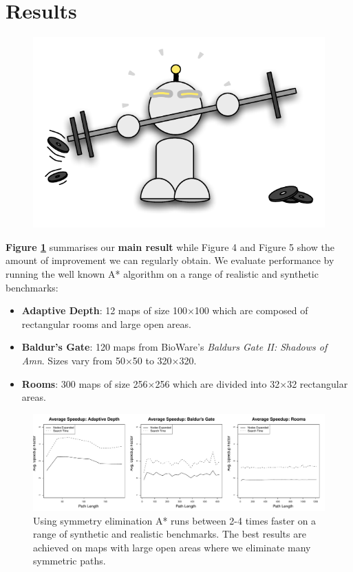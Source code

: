 \section{Results}

 \begin{figure}
    	\includegraphics[width=0.25\columnwidth, trim=0mm 10mm 0mm 0mm]{diagrams/robot_weights.pdf}
 \end{figure}
\textbf{Figure \ref{fig:speedup}} summarises our \textbf{main result} while Figure
4 and Figure 5 show the amount of improvement we
can regularly obtain. We evaluate performance by running the well known A* algorithm on a range of realistic and synthetic benchmarks:
\begin{itemize}
\item{
\textbf{Adaptive Depth}: 12 maps of size 100$\times$100 which are composed of
rectangular rooms and large open areas.
}
\item{
\textbf{Baldur's Gate}: 120 maps from BioWare's \emph{Baldurs Gate II: Shadows
of Amn}. Sizes vary from 50$\times$50 to 320$\times$320.
}
\item{
\textbf{Rooms}: 300 maps of size 256$\times$256 which are divided into 32$\times$32
rectangular areas. 
}
\end{itemize}


\begin{figure}[h]
\vspace{1em}
\label{fig:speedup}
\begin{center}
\includegraphics[width=\columnwidth]{diagrams/speedup}
\caption{Using symmetry elimination A* runs between 2-4 times faster on a range of synthetic
and realistic benchmarks.
The best results are achieved on maps with large open areas where we eliminate
many symmetric paths.}
\end{center}
\end{figure}

